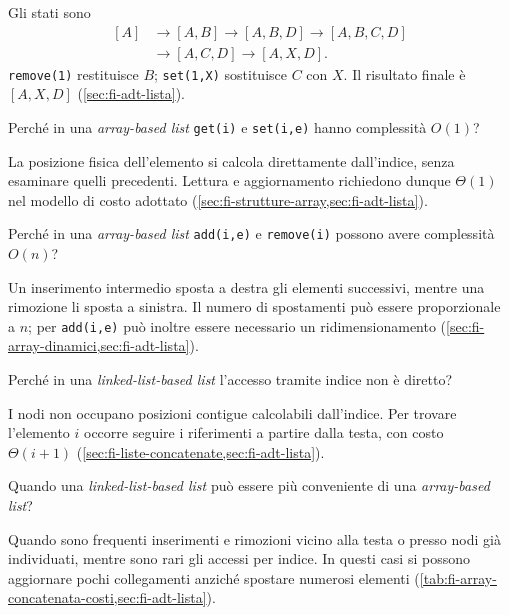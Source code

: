 Gli stati sono
\[
\begin{aligned}
  [A]&\to[A,B]\to[A,B,D]\to[A,B,C,D]\\
     &\to[A,C,D]\to[A,X,D].
\end{aligned}
\]
\texttt{remove(1)} restituisce \(B\); \texttt{set(1,X)} sostituisce \(C\) con
\(X\). Il risultato finale è \([A,X,D]\) (\cref{sec:fi-adt-lista}).

\begin{exercise}
\label{ex:fi-esercizi-strutture-dati-list-array-get-set}
Perché in una \emph{array-based list} \texttt{get(i)} e \texttt{set(i,e)} hanno
complessità \(O(1)\)?
\end{exercise}

La posizione fisica dell'elemento si calcola direttamente dall'indice, senza
esaminare quelli precedenti. Lettura e aggiornamento richiedono dunque
\(\Theta(1)\) nel modello di costo adottato
(\cref{sec:fi-strutture-array,sec:fi-adt-lista}).

\begin{exercise}
\label{ex:fi-esercizi-strutture-dati-list-array-add-remove}
Perché in una \emph{array-based list} \texttt{add(i,e)} e \texttt{remove(i)}
possono avere complessità \(O(n)\)?
\end{exercise}

Un inserimento intermedio sposta a destra gli elementi successivi, mentre una
rimozione li sposta a sinistra. Il numero di spostamenti può essere
proporzionale a \(n\); per \texttt{add(i,e)} può inoltre essere necessario un
ridimensionamento (\cref{sec:fi-array-dinamici,sec:fi-adt-lista}).

\begin{exercise}
\label{ex:fi-esercizi-strutture-dati-list-linked-indice}
Perché in una \emph{linked-list-based list} l'accesso tramite indice non è
diretto?
\end{exercise}

I nodi non occupano posizioni contigue calcolabili dall'indice. Per trovare
l'elemento \(i\) occorre seguire i riferimenti a partire dalla testa, con costo
\(\Theta(i+1)\) (\cref{sec:fi-liste-concatenate,sec:fi-adt-lista}).

\begin{exercise}
\label{ex:fi-esercizi-strutture-dati-list-linked-convenienza}
Quando una \emph{linked-list-based list} può essere più conveniente di una
\emph{array-based list}?
\end{exercise}

Quando sono frequenti inserimenti e rimozioni vicino alla testa o presso nodi
già individuati, mentre sono rari gli accessi per indice. In questi casi si
possono aggiornare pochi collegamenti anziché spostare numerosi elementi
(\cref{tab:fi-array-concatenata-costi,sec:fi-adt-lista}).

